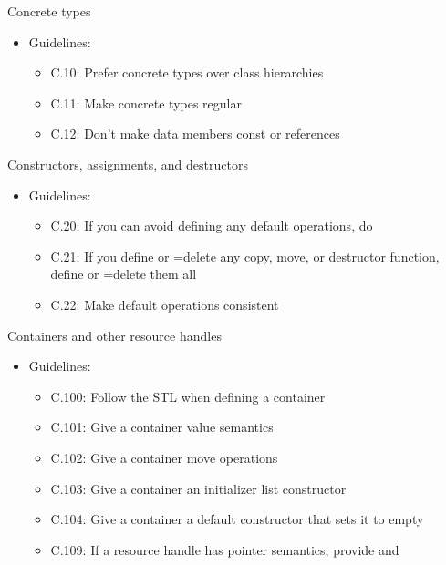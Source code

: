 \begin{frame}[t]{Concrete types}
\begin{itemize}
  \item Guidelines:
    \begin{itemize}
      \item C.10: Prefer concrete types over class hierarchies
      \item C.11: Make concrete types regular
      \item C.12: Don’t make data members const or references
    \end{itemize}
\end{itemize}
\end{frame}

\begin{frame}[t]{Constructors, assignments, and destructors}
\begin{itemize}
  \item Guidelines:
    \begin{itemize}
      \item C.20: If you can avoid defining any default operations, do
      \item C.21: If you define or =delete any copy, move, or destructor function, define or =delete them all
      \item C.22: Make default operations consistent
    \end{itemize}
\end{itemize}
\end{frame}

\begin{frame}[t]{Containers and other resource handles}
\begin{itemize}
  \item Guidelines:
    \begin{itemize}
      \item C.100: Follow the STL when defining a container
      \item C.101: Give a container value semantics
      \item C.102: Give a container move operations
      \item C.103: Give a container an initializer list constructor
      \item C.104: Give a container a default constructor that sets it to empty
      \item C.109: If a resource handle has pointer semantics, 
            provide \cppkey{*} and \cppkey{->}
    \end{itemize}
\end{itemize}
\end{frame}

